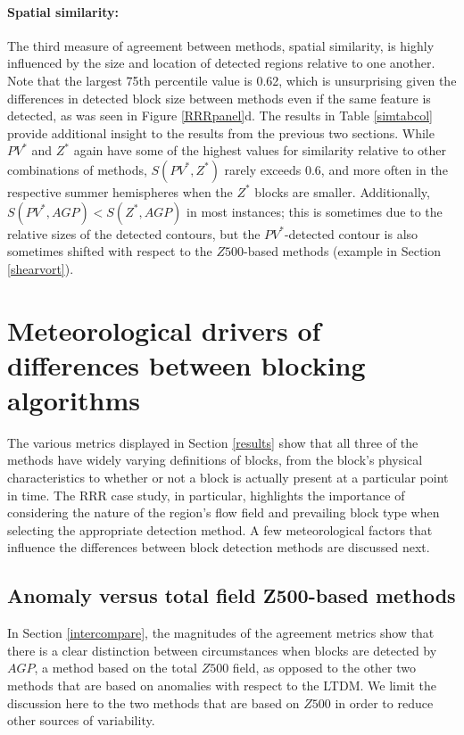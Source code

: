 \documentclass[smallextended]{svjour3}       %
\numberwithin{equation}{section}
\begin{document}
\paragraph{Spatial similarity:} The third measure of agreement between methods, spatial similarity, is highly influenced by the size and location of detected regions relative to one another. Note that the largest 75th percentile value is 0.62, which is unsurprising given the differences in detected block size between methods even if the same feature is detected, as was seen in Figure \ref{RRRpanel}d.   The results in Table \ref{simtabcol} provide additional insight to the results from the previous two sections. While $PV^*$ and $Z^*$ again have some of the highest values for similarity relative to other combinations of methods, $S(PV^*,Z^*)$ rarely exceeds 0.6, and more often in the respective summer hemispheres when the $Z^*$ blocks are smaller. Additionally, $S(PV^*,AGP)<S(Z^*,AGP)$ in most instances; this is sometimes due to the relative sizes of the detected contours, but the $PV^*$-detected contour is also sometimes shifted with respect to the $Z500$-based methods (example in Section \ref{shearvort}).




\section{Meteorological drivers of differences between blocking algorithms}\label{influences}

The various metrics displayed in Section \ref{results} show that all three of the methods have widely varying definitions of blocks, from the block's physical characteristics to whether or not a block is actually present at a particular point in time. The RRR case study, in particular, highlights the importance of considering the nature of the region's flow field and prevailing block type when selecting the appropriate detection method. A few meteorological factors that influence the differences between block detection methods are discussed next.


\subsection{Anomaly versus total field Z500-based methods}\label{anominst}

In Section \ref{intercompare}, the magnitudes of the agreement metrics show that there is a clear distinction between circumstances when blocks are detected by $AGP$, a method based on the total $Z500$ field, as opposed to the other two methods that are based on anomalies with respect to the LTDM. We limit the discussion here to the two methods that are based on $Z500$ in order to reduce other sources of variability.
\end{document}
